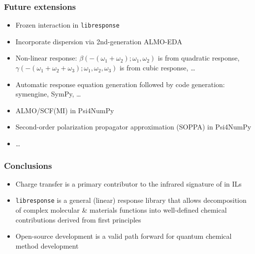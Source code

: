 \documentclass[%
    xcolor=usenames,dvipsnames,svgnames%
]{beamer}
\newcommand\pfn{Psi4NumPy}
\newcommand\libresponse{\texttt{libresponse}}
\begin{document}
\begin{frame}
  \frametitle{Future extensions}
  \begin{itemize}
  \item Frozen interaction in \libresponse{}
  \item Incorporate dispersion via 2nd-generation ALMO-EDA
  \item Non-linear response: \(\beta(-(\omega_{1}+\omega_{2});\omega_{1},\omega_{2})\) is from quadratic response, \(\gamma(-(\omega_{1}+\omega_{2}+\omega_{3});\omega_{1},\omega_{2},\omega_{3})\) is from cubic response, \dots
  \item Automatic response equation generation followed by code generation: symengine, SymPy, \dots
  \item ALMO/SCF(MI) in \pfn{}
  \item Second-order polarization propagator approximation (SOPPA) in \pfn{}
  \item \dots
  \end{itemize}
\end{frame}

\begin{frame}
  \frametitle{Conclusions}
  \begin{itemize}
  \item Charge transfer is a primary contributor to the infrared signature of  in ILs
  \item \libresponse{} is a general (linear) response library that allows decomposition of complex molecular \& materials functions into well-defined chemical contributions derived from first principles
  \item Open-source development is a valid path forward for quantum chemical method development
  \end{itemize}
\end{frame}
\end{document}
